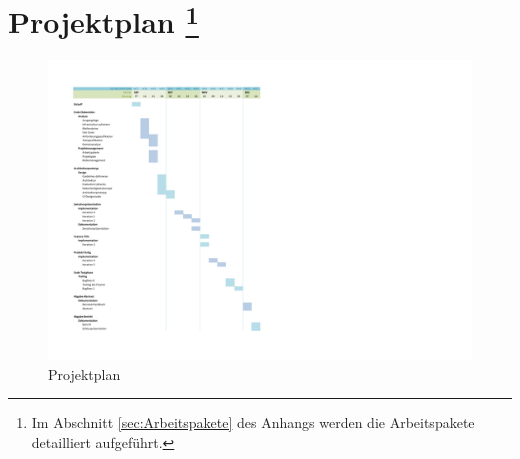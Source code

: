 \section[Projektplan]{Projektplan \footnote{Im Abschnitt \ref{sec:Arbeitspakete} des Anhangs werden die Arbeitspakete detailliert aufgeführt.}}
\label{sec:Projektplan}

\begin{figure}[H]
    \begin{center}
        \includegraphics[trim=30 60 0 50]{projectmanagement/res/projektplan}
    \end{center}
    \caption{Projektplan}
\end{figure}